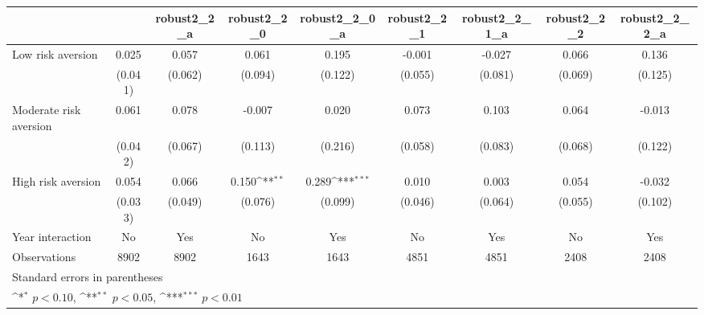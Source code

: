 {
\def\sym#1{\ifmmode^{#1}\else\(^{#1}\)\fi}
\begin{tabular}{l*{8}{c}}
\toprule
                &\multicolumn{1}{c}{}&\multicolumn{1}{c}{robust2\_2\_a}&\multicolumn{1}{c}{robust2\_2\_0}&\multicolumn{1}{c}{robust2\_2\_0\_a}&\multicolumn{1}{c}{robust2\_2\_1}&\multicolumn{1}{c}{robust2\_2\_1\_a}&\multicolumn{1}{c}{robust2\_2\_2}&\multicolumn{1}{c}{robust2\_2\_2\_a}\\
\midrule
Low risk aversion&    0.025         &    0.057         &    0.061         &    0.195         &   -0.001         &   -0.027         &    0.066         &    0.136         \\
                &  (0.041)         &  (0.062)         &  (0.094)         &  (0.122)         &  (0.055)         &  (0.081)         &  (0.069)         &  (0.125)         \\
\addlinespace
Moderate risk aversion&    0.061         &    0.078         &   -0.007         &    0.020         &    0.073         &    0.103         &    0.064         &   -0.013         \\
                &  (0.042)         &  (0.067)         &  (0.113)         &  (0.216)         &  (0.058)         &  (0.083)         &  (0.068)         &  (0.122)         \\
\addlinespace
High risk aversion&    0.054         &    0.066         &    0.150\sym{**} &    0.289\sym{***}&    0.010         &    0.003         &    0.054         &   -0.032         \\
                &  (0.033)         &  (0.049)         &  (0.076)         &  (0.099)         &  (0.046)         &  (0.064)         &  (0.055)         &  (0.102)         \\
\addlinespace
Year interaction &       No         &      Yes         &       No         &      Yes         &       No         &      Yes         &       No         &      Yes         \\
\midrule
Observations    &     8902         &     8902         &     1643         &     1643         &     4851         &     4851         &     2408         &     2408         \\
\bottomrule
\multicolumn{9}{l}{\footnotesize Standard errors in parentheses}\\
\multicolumn{9}{l}{\footnotesize \sym{*} \(p<0.10\), \sym{**} \(p<0.05\), \sym{***} \(p<0.01\)}\\
\end{tabular}
}
